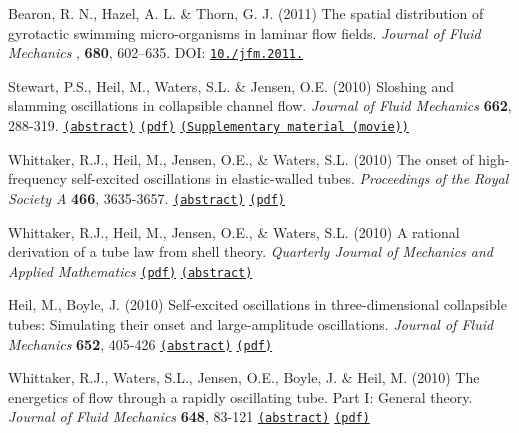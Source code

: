 \begin{DoxyItemize}
\item Bearon, R. N., Hazel, A. L. \& Thorn, G. J. (2011) The spatial distribution of gyrotactic swimming micro-\/organisms in laminar flow fields. {\itshape  Journal of Fluid Mechanics }, {\bfseries 680}, 602--635. D\+OI\+: \href{http://dx.doi.org/10.1017/jfm.2011.198}{\tt 10./jfm.2011.}
\item Stewart, P.\+S., Heil, M., Waters, S.\+L. \& Jensen, O.\+E. (2010) Sloshing and slamming oscillations in collapsible channel flow. {\itshape Journal of Fluid Mechanics} {\bfseries 662}, 288-\/319. \href{http://www.maths.man.ac.uk/~mheil/MATTHIAS/ABSTRACTS/StewartEtAl2010.html}{\tt (abstract)} \href{http://www.maths.man.ac.uk/~mheil/MATTHIAS/PDF/StewartEtAl2010.pdf}{\tt (pdf)} \href{http://journals.cambridge.org/fulltext_content/supplementary/S0022112010003277sup001/index.htm}{\tt (Supplementary material (movie))}
\item Whittaker, R.\+J., Heil, M., Jensen, O.\+E., \& Waters, S.\+L. (2010) The onset of high-\/frequency self-\/excited oscillations in elastic-\/walled tubes. {\itshape Proceedings of the Royal Society A} {\bfseries 466}, 3635-\/3657. \href{http://www.maths.man.ac.uk/~mheil/MATTHIAS/ABSTRACTS/WhittakerEtAlProcRoySoc2009.html}{\tt (abstract)} \href{http://www.maths.man.ac.uk/~mheil/MATTHIAS/PDF/WhittakerEtAlProcRoySoc2010.pdf}{\tt (pdf)}
\item Whittaker, R.\+J., Heil, M., Jensen, O.\+E., \& Waters, S.\+L. (2010) A rational derivation of a tube law from shell theory. {\itshape Quarterly Journal of Mechanics and Applied Mathematics } \href{http://qjmam.oxfordjournals.org/cgi/reprint/hbq020?ijkey=UMRmzz13qllX4v4&keytype=ref}{\tt (pdf)} \href{http://qjmam.oxfordjournals.org/cgi/content/abstract/hbq020?ijkey=UMRmzz13qllX4v4&keytype=ref}{\tt (abstract)}
\item Heil, M., Boyle, J. (2010) Self-\/excited oscillations in three-\/dimensional collapsible tubes\+: Simulating their onset and large-\/amplitude oscillations. {\itshape Journal of Fluid Mechanics} {\bfseries 652}, 405-\/426 \href{http://www.maths.man.ac.uk/~mheil/MATTHIAS/ABSTRACTS/HeilBoyle2009.html}{\tt (abstract)} \href{http://www.maths.man.ac.uk/~mheil/MATTHIAS/PDF/HeilBoyleJFM2010.pdf}{\tt (pdf)}
\item Whittaker, R.\+J., Waters, S.\+L., Jensen, O.\+E., Boyle, J. \& Heil, M. (2010) The energetics of flow through a rapidly oscillating tube. Part I\+: General theory. {\itshape Journal of Fluid Mechanics} {\bfseries 648}, 83-\/121 \href{http://www.maths.man.ac.uk/~mheil/MATTHIAS/ABSTRACTS/WhittakerEtAlPart1_2008.html}{\tt (abstract)} \href{http://www.maths.man.ac.uk/~mheil/MATTHIAS/PDF/WhittakerEtAlPart1.pdf}{\tt (pdf)}

\end{DoxyItemize}
